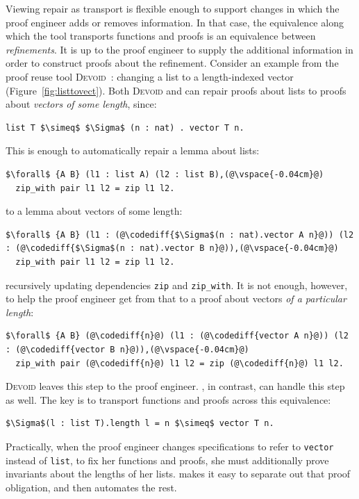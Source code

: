 Viewing repair as transport is flexible enough to support changes in which the proof engineer adds or removes information.
In that case, the equivalence along which the tool transports functions and proofs
is an equivalence between \textit{refinements}.
It is up to the proof engineer to supply the additional information in order to construct proofs about the refinement.
Consider an example from the proof reuse tool \textsc{Devoid}~\cite{Ringer2019}:
changing a list to a length-indexed vector (Figure~\ref{fig:listtovect}).
Both \textsc{Devoid} and \toolname can repair proofs about lists to proofs about \textit{vectors of some length}, since:

\begin{lstlisting}
list T $\simeq$ $\Sigma$ (n : nat) . vector T n.
\end{lstlisting}
This is enough to automatically repair a lemma about lists:

\begin{lstlisting}
$\forall$ {A B} (l1 : list A) (l2 : list B),(@\vspace{-0.04cm}@)
  zip_with pair l1 l2 = zip l1 l2.
\end{lstlisting}
to a lemma about vectors of some length:

\begin{lstlisting}
$\forall$ {A B} (l1 : (@\codediff{$\Sigma$(n : nat).vector A n}@)) (l2 : (@\codediff{$\Sigma$(n : nat).vector B n}@)),(@\vspace{-0.04cm}@)
  zip_with pair l1 l2 = zip l1 l2.
\end{lstlisting}
recursively updating dependencies \lstinline{zip} and \lstinline{zip_with}.
It is not enough, however, to help the proof engineer get from that to a proof about vectors \textit{of a particular length}:

\begin{lstlisting}
$\forall$ {A B} (@\codediff{n}@) (l1 : (@\codediff{vector A n}@)) (l2 : (@\codediff{vector B n}@)),(@\vspace{-0.04cm}@)
  zip_with pair (@\codediff{n}@) l1 l2 = zip (@\codediff{n}@) l1 l2.
\end{lstlisting}

\textsc{Devoid} leaves this step to the proof engineer.
\toolname, in contrast, can handle this step as well.
The key is to transport functions and proofs across this equivalence:

\begin{lstlisting}
$\Sigma$(l : list T).length l = n $\simeq$ vector T n.
\end{lstlisting}
Practically, when the proof engineer changes specifications to refer to \lstinline{vector} instead of \lstinline{list},
to fix her functions and proofs, she must additionally prove invariants about the lengths of her lists.
\toolname makes it easy to separate out that proof obligation, and then automates the rest.

